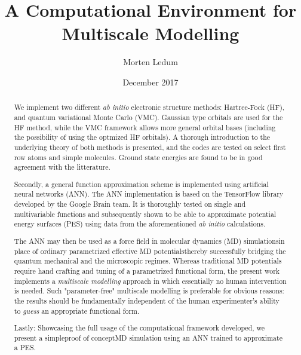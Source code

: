 \documentclass[twoside,english]{uiofysmaster}
\author{Morten Ledum}
\title{A Computational Environment for Multiscale Modelling}
\date{December 2017}
\begin{document}
\newcommand{\mainfile}{}
\maketitle

\begin{abstract}
We implement two different \emph{ab initio} electronic structure methods: Hartree-Fock (HF), and quantum variational Monte Carlo (VMC). Gaussian type orbitals are used for the HF method, while the VMC framework allows more general orbital bases (including the possibility of using the optmized HF orbitals). A thorough introduction to the underlying theory of both methods is presented, and the codes are tested on select first row atoms and simple molecules. Ground state energies are found to be in good agreement with the litterature. 

Secondly, a general function approximation scheme is implemented using artificial neural networks (ANN). The ANN implementation is based on the TensorFlow library developed by the Google Brain team. It is thoroughly tested on single and multivariable functions and subsequently shown to be able to approximate potential energy surfaces (PES) using data from the aforementioned \emph{ab initio} calculations.

The ANN may then be used as a force field in molecular dynamics (MD) simulations\textemdash in place of ordinary parametrized effective MD potentials\textemdash thereby successfully bridging the quantum mechanical and the microscopic regimes. Whereas traditional MD potentials require hand crafting and tuning of a parametrized functional form, the present work implements a \emph{multiscale modelling} approach in which essentially no human intervention is needed. Such "parameter-free" multiscale modelling is preferable for obvious reasons: the results should be fundamentally independent of the human experimenter's ability to \emph{guess} an appropriate functional form.

Lastly: Showcasing the full usage of the computational framework developed, we present a simple\textemdash proof of concept\textemdash MD simulation using an ANN trained to approximate a PES. 

\end{abstract}
\end{document}
